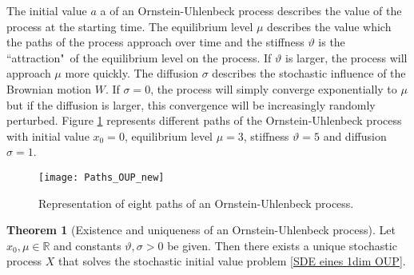 \documentclass[11pt,titlepage]{article}
\newcommand{\R}{\mathbb{R}} %
\theoremstyle{definition}
\newtheorem{theorem}{Theorem}[section]
\theoremstyle{remark}
\begin{document}
	The initial value $a$ a of an Ornstein-Uhlenbeck process describes the value of the process at the starting time. The equilibrium level $\mu$ describes the value which the paths of the process approach over time and the stiffness $\vartheta$ is the ``attraction"\ of the equilibrium level on the process. If $\vartheta$ is larger, the process will approach $\mu$  more quickly. The diffusion $\sigma$ describes the stochastic influence of the Brownian motion $W$. If $\sigma = 0$, the process will simply converge exponentially to $\mu$ 
	but if the diffusion is larger, this convergence will be increasingly randomly perturbed.
	Figure \ref{Abb Pfade OUP} represents different paths of the Ornstein-Uhlenbeck process with initial value $x_0=0$, equilibrium level $\mu = 3$, stiffness $\vartheta = 5$ and diffusion $\sigma =1$.
	
	\begin{figure}[h!]
		\centering
		\texttt{[image: Paths\_OUP\_new]}
		\caption{Representation of eight paths of an Ornstein-Uhlenbeck process.}
		\label{Abb Pfade OUP}
	\end{figure}
	
	\begin{theorem}[Existence and uniqueness of an Ornstein-Uhlenbeck process]\label{OUP ex and unique 1dim}
		Let $x_0,\mu\in\R$ and constants $\vartheta,\sigma>0$ be given. Then there exists a unique 
		stochastic process $X$ that solves the stochastic initial value problem \ref{SDE eines 1dim OUP}.
	\end{theorem}

	
	
\end{document}
